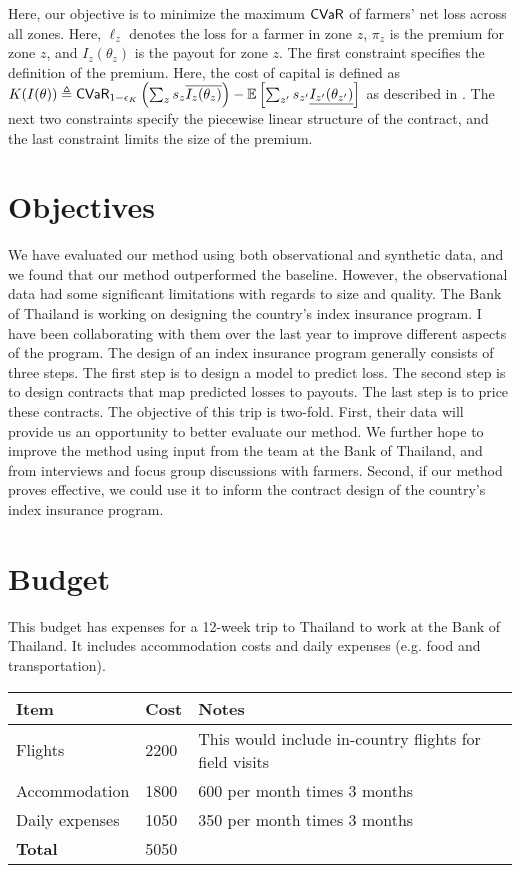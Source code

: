 \documentclass[12pt]{article}
\begin{document}
  Here, our objective is to minimize the maximum ${\sf CVaR}$ of farmers' net loss across all zones. Here, $\ell_z$ denotes the loss for a farmer in zone $z$, $\pi_z$ is the premium for zone $z$, and $I_z(\theta_z)$ is the payout for zone $z$. The first constraint specifies the definition of the premium. Here, the cost of capital is defined as $K(I(\theta)) \triangleq {\sf CVaR}_{1-\epsilon_K} \left ( \sum_z s_z\overline{I_z(\theta_z)} \right ) - \mathbb{E}\left [ \sum_{z'} s_{z'}\underline{I_{z'}(\theta_{z'})} \right ]$ as described in \cite{mapfumo2017risk}. The next two constraints specify the piecewise linear structure of the contract, and the last constraint limits the size of the premium. 

\section{Objectives}
  We have evaluated our method using both observational and synthetic data, and we found that our method outperformed the baseline. However, the observational data had some significant limitations with regards to size and quality. The Bank of Thailand is working on designing the country's index insurance program. I have been collaborating with them over the last year to improve different aspects of the program. The design of an index insurance program generally consists of three steps. The first step is to design a model to predict loss. The second step is to design contracts that map predicted losses to payouts. The last step is to price these contracts. The objective of this trip is two-fold. First, their data will provide us an opportunity to better evaluate our method. We further hope to improve the method using input from the team at the Bank of Thailand, and from interviews and focus group discussions with farmers.  Second, if our method proves effective, we could use it to inform the contract design of the country's index insurance program. 

  \newpage
\section*{Budget}
This budget has expenses for a 12-week trip to Thailand to work at the Bank of Thailand. It includes accommodation costs and daily expenses (e.g. food and transportation).

\begin{table}[H]
  \centering
  \begin{tabular}{|l|l|l|}
  \hline
  \textbf{Item}  & \textbf{Cost} & \textbf{Notes}                                         \\ \hline
  Flights        & 2200          & This would include in-country flights for field visits \\ \hline
  Accommodation   & 1800          &  600 per month times 3 months                                          \\ \hline
  Daily expenses & 1050           & 350 per month times 3 months                                            \\ \hline
  \textbf{Total} & 5050 & \\ \hline
  \end{tabular}
  \end{table}
\end{document}
